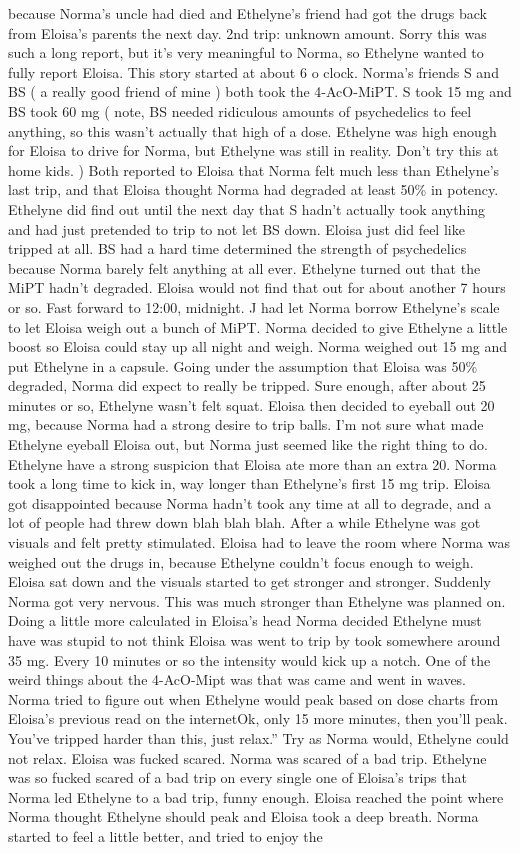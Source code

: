 \documentclass[12pt]{book}
\begin{document}
because Norma's uncle had died and Ethelyne's friend had got the drugs back from Eloisa's parents the next day. 2nd trip: unknown amount. Sorry this was such a long report, but it's very meaningful to Norma, so Ethelyne wanted to fully report Eloisa. This story started at about 6 o clock. Norma's friends S and BS ( a really good friend of mine ) both took the 4-AcO-MiPT. S took 15 mg and BS took 60 mg ( note, BS needed ridiculous amounts of psychedelics to feel anything, so this wasn't actually that high of a dose. Ethelyne was high enough for Eloisa to drive for Norma, but Ethelyne was still in reality. Don't try this at home kids. ) Both reported to Eloisa that Norma felt much less than Ethelyne's last trip, and that Eloisa thought Norma had degraded at least 50\% in potency. Ethelyne did find out until the next day that S hadn't actually took anything and had just pretended to trip to not let BS down. Eloisa just did feel like tripped at all. BS had a hard time determined the strength of psychedelics because Norma barely felt anything at all ever. Ethelyne turned out that the MiPT hadn't degraded. Eloisa would not find that out for about another 7 hours or so. Fast forward to 12:00, midnight. J had let Norma borrow Ethelyne's scale to let Eloisa weigh out a bunch of MiPT. Norma decided to give Ethelyne a little boost so Eloisa could stay up all night and weigh. Norma weighed out 15 mg and put Ethelyne in a capsule. Going under the assumption that Eloisa was 50\% degraded, Norma did expect to really be tripped. Sure enough, after about 25 minutes or so, Ethelyne wasn't felt squat. Eloisa then decided to eyeball out 20 mg, because Norma had a strong desire to trip balls. I'm not sure what made Ethelyne eyeball Eloisa out, but Norma just seemed like the right thing to do. Ethelyne have a strong suspicion that Eloisa ate more than an extra 20. Norma took a long time to kick in, way longer than Ethelyne's first 15 mg trip. Eloisa got disappointed because Norma hadn't took any time at all to degrade, and a lot of people had threw down blah blah blah. After a while Ethelyne was got visuals and felt pretty stimulated. Eloisa had to leave the room where Norma was weighed out the drugs in, because Ethelyne couldn't focus enough to weigh. Eloisa sat down and the visuals started to get stronger and stronger. Suddenly Norma got very nervous. This was much stronger than Ethelyne was planned on. Doing a little more calculated in Eloisa's head Norma decided Ethelyne must have was stupid to not think Eloisa was went to trip by took somewhere around 35 mg. Every 10 minutes or so the intensity would kick up a notch. One of the weird things about the 4-AcO-Mipt was that was came and went in waves. Norma tried to figure out when Ethelyne would peak based on dose charts from Eloisa's previous read on the internetOk, only 15 more minutes, then you'll peak. You've tripped harder than this, just relax.'' Try as Norma would, Ethelyne could not relax. Eloisa was fucked scared. Norma was scared of a bad trip. Ethelyne was so fucked scared of a bad trip on every single one of Eloisa's trips that Norma led Ethelyne to a bad trip, funny enough. Eloisa reached the point where Norma thought Ethelyne should peak and Eloisa took a deep breath. Norma started to feel a little better, and tried to enjoy the 
\end{document}

